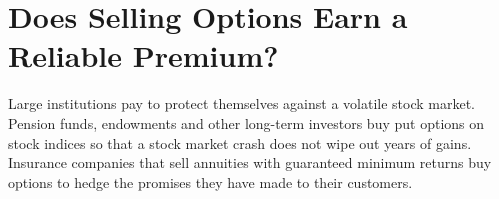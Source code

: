 \makeatletter
{}
\makeatother

\makeatletter
\makeatother

\chapter{Does Selling Options Earn a Reliable Premium?}
\label{ch:19}
\providecommand{\term}[1]{\emph{#1}}

Large institutions pay to protect themselves against a volatile stock market. Pension funds, endowments and other long-term investors buy put options on stock indices so that a stock market crash does not wipe out years of gains. Insurance companies that sell annuities with guaranteed minimum returns buy options to hedge the promises they have made to their customers.

